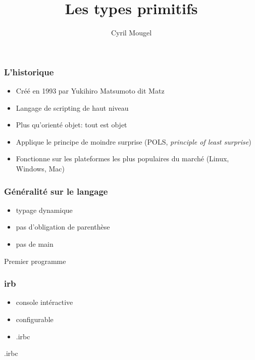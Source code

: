 \documentclass{beamer}
\title{Les types primitifs}
\author{Cyril Mougel}
\begin{document}
\begin{frame}
  \titlepage
\end{frame}

\Large{}

\begin{frame}
	\frametitle{L'historique}
	\begin{itemize}
		\item Créé en 1993 par Yukihiro Matsumoto dit \og{}Matz\fg{}
		\item Langage de scripting de haut niveau
		\item Plus qu'orienté objet: tout est objet
        \item Applique le principe de moindre surprise (POLS, \emph{principle of
                least surprise})
        \item Fonctionne sur les plateformes les plus populaires du marché (Linux, Windows,
                Mac)
	\end{itemize}
\end{frame}

\begin{frame}
  \frametitle{G\'en\'eralit\'e sur le langage}
  \begin{itemize}
    \item typage dynamique
    \item pas d'obligation de parenthèse
    \item pas de main
  \end{itemize}
\end{frame}

\begin{frame}
  \begin{beamerboxesrounded}{Premier programme}
    
  \end{beamerboxesrounded}
\end{frame}

\begin{frame}
  \frametitle{irb}
  \begin{itemize}
    \item console intéractive
    \item configurable
    \item .irbc
  \end{itemize}
\end{frame}

\begin{frame}
  \begin{beamerboxesrounded}{.irbc}
    
  \end{beamerboxesrounded}
\end{frame}
\end{document}
